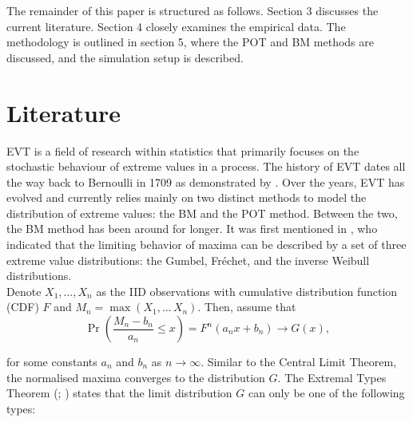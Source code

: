 \documentclass[a4paper,12pt]{article}
\theoremstyle{plain}
\begin{document}
The remainder of this paper is structured as follows. Section 3 discusses the current literature. Section 4 closely examines the empirical data. The methodology is outlined in section 5, where the POT and BM methods are discussed, and the simulation setup is described.  

\section{Literature}
EVT is a field of research within statistics that primarily focuses on the stochastic behaviour of extreme values in a process. The history of EVT dates all the way back to Bernoulli in 1709 as demonstrated by . Over the years, EVT has evolved and currently relies mainly on two distinct methods to model the distribution of extreme values: the BM and the POT method. Between the two, the BM method has been around for longer. It was first mentioned in , who indicated that the limiting behavior of maxima can be described by a set of three extreme value distributions: the Gumbel, Fr\'echet, and the inverse Weibull distributions. \\

Denote $X_1, \dots, X_n$ as the IID observations with cumulative distribution function (CDF) $F$ and $M_n = \max\left(X_1,\dots\,X_n\right)$. Then, assume that 
\begin{equation}
\Pr\left(\frac{M_n-b_n}{a_n}\leq x\right)=F^n\left(a_nx+b_n\right)\to G\left(x\right),
\end{equation}

\noindent for some constants $a_n$ and $b_n$ as $n\to\infty$. Similar to the Central Limit Theorem, the normalised maxima converges to the distribution $G$. The Extremal Types Theorem (; ) states that the limit distribution $G$ can only be one of the following types:
\end{document}
